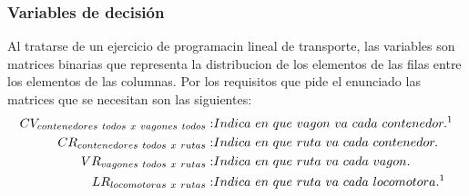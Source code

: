 \documentclass[11pt,spanish]{article}
\begin{document}
			\subsubsection{Variables de decisión}
			Al tratarse de un ejercicio de programacin lineal de transporte, las variables son matrices binarias que representa la distribucion de los elementos de las filas entre los elementos de las columnas. Por los requisitos que pide el enunciado las matrices que se necesitan son las siguientes:
			\begin{align*}
				CV_{contenedores\ todos\ x\ vagones\ todos} :& Indica\ en\ que\ vagon\ va\ cada\ contenedor.\text{\footnotemark} \\
				CR_{contenedores\ todos\ x\ rutas} :& Indica\ en\ que\ ruta\ va\ cada\ contenedor.\\
				VR_{vagones\ todos\ x\ rutas} :& Indica\ en\ que\ ruta\ va\ cada\ vagon.\\
				LR_{locomotoras\ x\ rutas} :& Indica\ en\ que\ ruta\ va\ cada\ locomotora.^1
			\end{align*}
\end{document}
